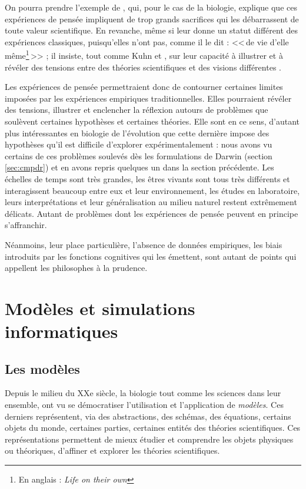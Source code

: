 On pourra prendre l'exemple de \citet[ch. I]{wilson1999biological}, qui, pour le cas de la biologie, explique que ces expériences de pensée impliquent de trop grands sacrifices qui les débarrassent de toute valeur scientifique. En revanche, même si \citet{hacking92dothoughtexperimentshavealifeoftheirown} leur donne un statut différent des expériences classiques, puisqu'elles n'ont pas, comme il le dit : <<\,de vie d'elle même\footnote{En anglais : \emph{Life on their own}}\,>> ; il insiste, tout comme Kuhn et \cite{lennox91darwinianthoughtexperimentsafunctionforjustsostories}, sur leur capacité à illustrer et à révéler des tensions entre des théories scientifiques et des visions différentes \citep[p. 304]{hacking92dothoughtexperimentshavealifeoftheirown}. 

Les expériences de pensée permettraient donc de contourner certaines limites imposées par les expériences empiriques traditionnelles. Elles pourraient révéler des tensions, illustrer et enclencher la réflexion autours de problèmes que soulèvent certaines hypothèses et certaines théories. Elle sont en ce sens, d'autant plus intéressantes en biologie de l'évolution que cette dernière impose des hypothèses qu'il est difficile d'explorer expérimentalement : nous avons vu certains de ces problèmes soulevés dès les formulations de Darwin (section \ref{sec:cmpdr}) et en avons repris quelques un dans la section précédente. Les échelles de temps sont très grandes, les êtres vivants sont tous très différents et interagissent beaucoup entre eux et leur environnement, les études en laboratoire, leurs interprétations et leur généralisation au milieu naturel restent extrêmement délicats.  Autant de problèmes dont les expériences de pensée peuvent en principe s'affranchir.

Néanmoins, leur place particulière, l'absence de données empiriques, les biais introduits par les fonctions cognitives qui les émettent, sont autant de points qui appellent les philosophes à la prudence. 
\section{Modèles et simulations informatiques}\label{sec:cmpdr:va} 

\subsection{Les modèles}
Depuis le milieu du XXe siècle, la biologie tout comme les sciences dans leur ensemble, ont vu se démocratiser l'utilisation et l'application de \emph{modèles}. Ces derniers représentent, via des abstractions, des schémas, des équations, certains objets du monde, certaines parties, certaines entités des théories scientifiques. Ces représentations permettent de mieux étudier et comprendre les objets physiques ou théoriques, d'affiner et explorer les théories scientifiques. 

